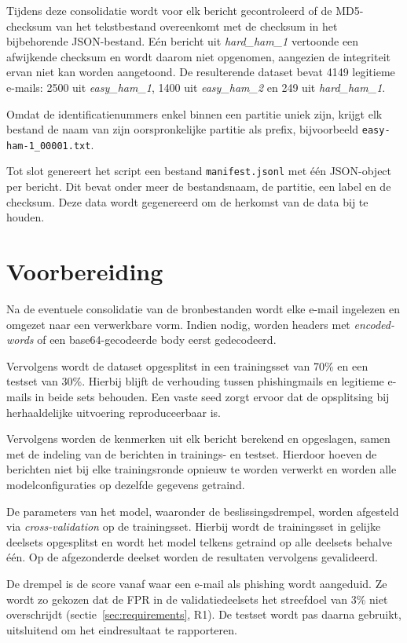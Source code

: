 Tijdens deze consolidatie wordt voor elk bericht gecontroleerd of de MD5-checksum van het tekstbestand overeenkomt met de checksum in het bijbehorende JSON-bestand. Eén bericht uit \emph{hard\_ham\_1} vertoonde een afwijkende checksum en wordt daarom niet opgenomen, aangezien de integriteit ervan niet kan worden aangetoond. De resulterende dataset bevat 4149 legitieme e-mails: 2500 uit \emph{easy\_ham\_1}, 1400 uit \emph{easy\_ham\_2} en 249 uit \emph{hard\_ham\_1}.

Omdat de identificatienummers enkel binnen een partitie uniek zijn, krijgt elk bestand de naam van zijn oorspronkelijke partitie als prefix, bijvoorbeeld \texttt{easy-ham-1\_00001.txt}.

Tot slot genereert het script een bestand \texttt{manifest.jsonl} met één JSON-object per bericht. Dit bevat onder meer de bestandsnaam, de partitie, een label en de checksum. Deze data wordt gegenereerd om de herkomst van de data bij te houden.


\section{Voorbereiding}%
\label{sec:voorbereiding}

Na de eventuele consolidatie van de bronbestanden wordt elke e-mail ingelezen en omgezet naar een verwerkbare vorm. Indien nodig, worden headers met \emph{encoded-words} of een base64-gecodeerde body eerst gedecodeerd.

Vervolgens wordt de dataset opgesplitst in een trainingsset van 70\% en een testset van 30\%. Hierbij blijft de verhouding tussen phishingmails en legitieme e-mails in beide sets behouden. Een vaste seed zorgt ervoor dat de opsplitsing bij herhaaldelijke uitvoering reproduceerbaar is.

Vervolgens worden de kenmerken uit elk bericht berekend en opgeslagen, samen met de indeling van de berichten in trainings- en testset. Hierdoor hoeven de berichten niet bij elke trainingsronde opnieuw te worden verwerkt en worden alle modelconfiguraties op dezelfde gegevens getraind.

De parameters van het model, waaronder de beslissingsdrempel, worden afgesteld via \emph{cross-validation} op de trainingsset. Hierbij wordt de trainingsset in gelijke deelsets opgesplitst en wordt het model telkens getraind op alle deelsets behalve één. Op de afgezonderde deelset worden de resultaten vervolgens gevalideerd.

De drempel is de score vanaf waar een e-mail als phishing wordt aangeduid. Ze wordt zo gekozen dat de FPR in de validatiedeelsets het streefdoel van 3\% niet overschrijdt (sectie~\ref{sec:requirements}, R1). De testset wordt pas daarna gebruikt, uitsluitend om het eindresultaat te rapporteren.

